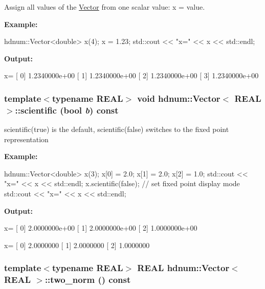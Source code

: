 Assign all values of the \hyperlink{classhdnum_1_1Vector}{Vector} from one scalar value: x = value. 

{\bfseries Example:} 
\begin{DoxyCode}
hdnum::Vector<double> x(4);
x = 1.23;
std::cout << "x=" << x << std::endl;
\end{DoxyCode}


{\bfseries Output:} \begin{DoxyVerb}
x=
[ 0]  1.2340000e+00
[ 1]  1.2340000e+00
[ 2]  1.2340000e+00
[ 3]  1.2340000e+00
	  \end{DoxyVerb}
 \hypertarget{classhdnum_1_1Vector_ab9befaae588c670c4bc2a848d9072b97}{
\subsubsection[{scientific}]{\setlength{\rightskip}{0pt plus 5cm}template$<$typename REAL$>$ void {\bf hdnum::Vector}$<$ REAL $>$::scientific (bool {\em b}) const}}
\label{classhdnum_1_1Vector_ab9befaae588c670c4bc2a848d9072b97}


scientific(true) is the default, scientific(false) switches to the fixed point representation 

{\bfseries Example:} 
\begin{DoxyCode}
  hdnum::Vector<double> x(3);
  x[0] = 2.0;
  x[1] = 2.0;
  x[2] = 1.0;
  std::cout << "x=" << x << std::endl;
  x.scientific(false); // set fixed point display mode
  std::cout << "x=" << x << std::endl;
\end{DoxyCode}


{\bfseries Output:} \begin{DoxyVerb}
x=
[ 0]  2.0000000e+00
[ 1]  2.0000000e+00
[ 2]  1.0000000e+00

x=
[ 0]      2.0000000
[ 1]      2.0000000
[ 2]      1.0000000
	  \end{DoxyVerb}
 \hypertarget{classhdnum_1_1Vector_a5d44d50fe956733a43a59300c559c13c}{
\subsubsection[{two\_\-norm}]{\setlength{\rightskip}{0pt plus 5cm}template$<$typename REAL$>$ REAL {\bf hdnum::Vector}$<$ REAL $>$::two\_\-norm () const}}
\label{classhdnum_1_1Vector_a5d44d50fe956733a43a59300c559c13c}


